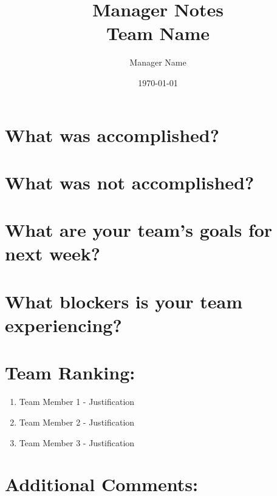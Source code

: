\documentclass{article}
\title{Manager Notes \\
    \Large{Team Name}
}
\author{Manager Name}
\date{\today}
\begin{document}
\maketitle



\section{What was accomplished? }








\section{What was not accomplished?}







\section{What are your team's goals for next week?}








\section{What blockers is your team experiencing?}









\section{Team Ranking:}
\begin{enumerate}
  \item Team Member 1 - Justification
  \item Team Member 2 - Justification
  \item Team Member 3 - Justification
\end{enumerate}


\section{Additional Comments:}






\end{document}
